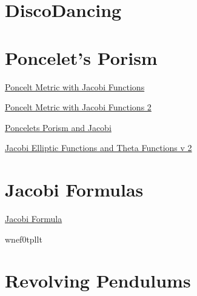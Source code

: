 \documentclass{ximera}
\begin{document}
\section*{DiscoDancing}

\section*{Poncelet's Porism}


\begin{onlineOnly}
    \begin{center}
\end{center}
\end{onlineOnly}

\href{https://www.desmos.com/calculator/q16ify3gtm}{Poncelt Metric with Jacobi Functions}



\begin{onlineOnly}
    \begin{center}
\end{center}
\end{onlineOnly}

\href{https://www.desmos.com/calculator/hm5zop04ob}{Poncelt Metric with Jacobi Functions 2}



\begin{onlineOnly}
    \begin{center}
\end{center}
\end{onlineOnly}

\href{https://www.desmos.com/calculator/lwbypn9rje}{Poncelets Porism and Jacobi}


\begin{onlineOnly}
    \begin{center}
\end{center}
\end{onlineOnly}

\href{https://www.desmos.com/calculator/svb8pwijet}{Jacobi Elliptic Functions and Theta Functions v 2}



\section{Jacobi Formulas}

\begin{onlineOnly}
    \begin{center}
\end{center}
\end{onlineOnly}

\href{https://www.desmos.com/calculator/wnef0tpllt}{Jacobi Formula}

wnef0tpllt


\section*{Revolving Pendulums}
\end{document}
